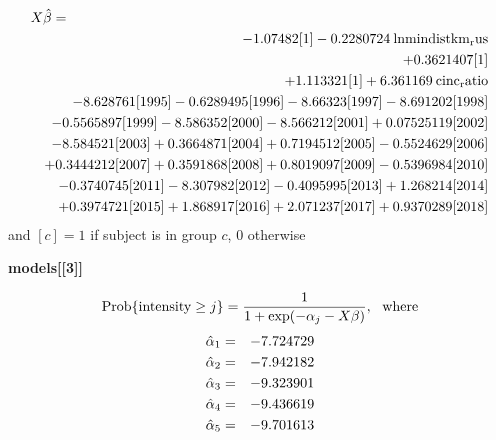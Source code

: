 \begin{eqnarray*}
\lefteqn{X\hat{\beta}=}\\
& &  -1.07482[{\rm 1}] -0.2280724\:{\rm lnmindistkm_rus} \\
& &  +0.3621407[{\rm 1}] \\
& &  +1.113321[{\rm 1}] +6.361169\:{\rm cinc_ratio} \\
& &  -8.628761 [{\rm 1995}]-0.6289495[{\rm 1996}]-8.66323  [{\rm 1997}]-8.691202 [{\rm 1998}] \\
& &  -0.5565897[{\rm 1999}]-8.586352 [{\rm 2000}]-8.566212 [{\rm 2001}]+0.07525119[{\rm 2002}] \\
& &  -8.584521 [{\rm 2003}]+0.3664871 [{\rm 2004}]+0.7194512 [{\rm 2005}]-0.5524629[{\rm 2006}] \\
& &  +0.3444212 [{\rm 2007}]+0.3591868 [{\rm 2008}]+0.8019097 [{\rm 2009}]-0.5396984[{\rm 2010}] \\
& &  -0.3740745[{\rm 2011}]-8.307982 [{\rm 2012}]-0.4095995[{\rm 2013}]+1.268214  [{\rm 2014}] \\
& &  +0.3974721 [{\rm 2015}]+1.868917  [{\rm 2016}]+2.071237  [{\rm 2017}]+0.9370289 [{\rm 2018}] \\
\end{eqnarray*}
and \([c]=1\) if subject is in group \(c\), 0 otherwise
\begin{center} \bf models[[3]] \end{center}
\[{\rm Prob}\{{\rm intensity}\geq j\} = \frac{1}{1+\exp(-\alpha_{j}-X\beta)}, {\rm \ \ where} \\ \]
\begin{eqnarray*}
\hat{\alpha}_{\rm 1} &=&-7.724729\\
\hat{\alpha}_{\rm 2} &=&-7.942182\\
\hat{\alpha}_{\rm 3} &=&-9.323901\\
\hat{\alpha}_{\rm 4} &=&-9.436619\\
\hat{\alpha}_{\rm 5} &=&-9.701613\\
\end{eqnarray*}

